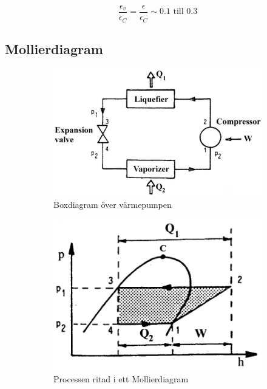 \documentclass[11pt]{article}
\begin{document}
\begin{equation}
    \frac{\epsilon_v}{\epsilon_C} = \frac{\epsilon}{\epsilon_C} \sim 0.1 \text{ till } 0.3
\end{equation}

\subsection{Mollierdiagram}


\begin{figure}[h]
\centering
\begin{subfigure}{.5\textwidth}
  \centering
  \includegraphics[width=1.08\linewidth]{./figures/BoxDiagram.png}
  \caption{Boxdiagram över värmepumpen}
  \label{Fig: Boxdiagram över värmepumpen}
\end{subfigure}%
\begin{subfigure}{.5\textwidth}
  \centering
  \includegraphics[width=.9\linewidth]{./figures/ProcessDiagram.png}
  \caption{Processen ritad i ett Mollierdiagram}
  \label{Fig: Processen ritad i ett Mollierdiagram}
\end{subfigure}
\caption{}
\end{figure}
\end{document}
